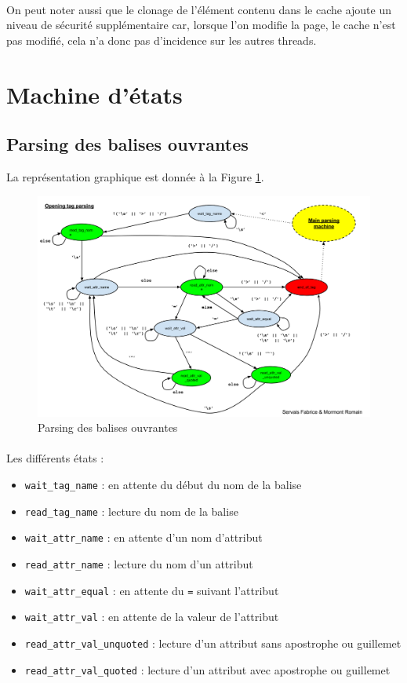 \documentclass[a4paper,11pt]{article}
\begin{document}
\paragraph{}
On peut noter aussi que le clonage de l'élément contenu dans le cache ajoute un niveau de sécurité supplémentaire car, lorsque l'on modifie la page, le cache n'est pas modifié, cela n'a donc pas d'incidence sur les autres threads.

\newpage
\appendix
\section{Machine d'états}
\subsection{Parsing des balises ouvrantes}
La représentation graphique est donnée à la Figure \ref{ref:pars_opening}.

\begin{figure}[h]
	\center
	\includegraphics[scale=0.35]{parseOpeningTagFSM.png}
	\caption{Parsing des balises ouvrantes}
	\label{ref:pars_opening}
\end{figure}

\paragraph{}
Les différents états :
\begin{itemize}
	\item \texttt{wait\_tag\_name} : en attente du début du nom de la balise 
	\item \texttt{read\_tag\_name} : lecture du nom de la balise
	\item \texttt{wait\_attr\_name} : en attente d'un nom d'attribut
	\item \texttt{read\_attr\_name} : lecture du nom d'un attribut
	\item \texttt{wait\_attr\_equal} : en attente du \texttt{=} suivant l'attribut
	\item \texttt{wait\_attr\_val} : en attente de la valeur de l'attribut
	\item \texttt{read\_attr\_val\_unquoted} : lecture d'un attribut sans apostrophe ou guillemet
	\item \texttt{read\_attr\_val\_quoted} :  lecture d'un attribut avec apostrophe ou guillemet
\end{itemize}
\end{document}
